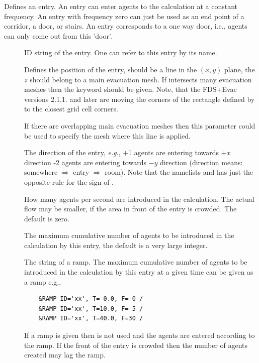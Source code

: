 \documentclass[12pt,a4paper,final,twoside]{stylevk}
\begin{document}
\noindent Defines an entry.  An entry can enter agents to the
calculation at a constant frequency.  An entry with frequency zero can
just be used as an end point of a corridor, a door, or stairs.  An
entry corresponds to a one way door, i.e., agents can only come
out from this 'door'.

\begin{description}
%
\item[] ID string of the entry.  One can refer to this entry
  by its name.
%
\item[] Defines the position of the entry, should be a line
  in the $(x,y)$ plane, the $z$ should belong to a main evacuation
  mesh.  If  intersects many evacuation meshes then the
  keyword  should be given.  Note, that the FDS+Evac
  versions 2.1.1. and later are moving the corners of the rectangle
  defined by  to the closest grid cell corners.
%
\item[] If there are overlapping main evacuation
  meshes then this parameter could be used to specify the mesh where
  this  line is applied.
%
\item[] The direction of the entry, \emph{e.g}., +1 agents
  are entering towards $+x$ direction -2 agents are entering towards
  $-y$ direction (direction means: somewhere $\Rightarrow$ entry
  $\Rightarrow$ room).  Note that the namelists  and
   has just the opposite rule for the sign of .
%
\item[] How many agents per second are introduced in
  the calculation. The actual flow may be smaller, if the area in
  front of the entry is crowded.  The default is zero.
%
\item[] The maximum cumulative number of agents to
  be introduced in the calculation by this entry, the default is a
  very large integer.
%
\item[] The  string of a ramp.  The
  maximum cumulative number of agents to be introduced in the
  calculation by this entry at a given time can be given as a ramp
  e.g., 
\begin{verbatim}
    &RAMP ID='xx', T= 0.0, F= 0 /
    &RAMP ID='xx', T=10.0, F= 5 /
    &RAMP ID='xx', T=40.0, F=30 /
\end{verbatim}
  If a ramp is given then  is not used and the agents
  are entered according to the ramp.  If the front of the entry is
  crowded then the number of agents created may lag the ramp.

\end{description}
\end{document}
